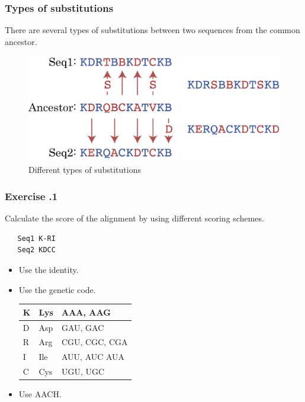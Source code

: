 \subsubsection*{Types of substitutions}
There are several types of substitutions between two sequences from the common ancestor. 
\begin{figure}[H]
  \centering
      \includegraphics[width=0.6 \textwidth]{fig11/potential_mutations.png}
  \caption{Different types of substitutions}
\end{figure}

%
%
\subsubsection*{Exercise \thesection.1}
Calculate the score of the alignment by using different scoring schemes.

\begin{verbatim}
   Seq1 K-RI
   Seq2 KDCC
\end{verbatim}

\begin{itemize}
\item Use the identity.
\bigskip 

\item Use the genetic code.

\begin{table}[H]
\centering
\begin{tabular}{|l|l|l|}
\hline
K & Lys & AAA, AAG      \\ \hline
D & Asp & GAU, GAC      \\ \hline
R & Arg & CGU, CGC, CGA \\ \hline
I & Ile & AUU, AUC AUA  \\ \hline
C & Cys & UGU, UGC      \\ \hline
\end{tabular}
\end{table}

\item Use AACH.
\bigskip 

\end{itemize}

\bigskip 

%
